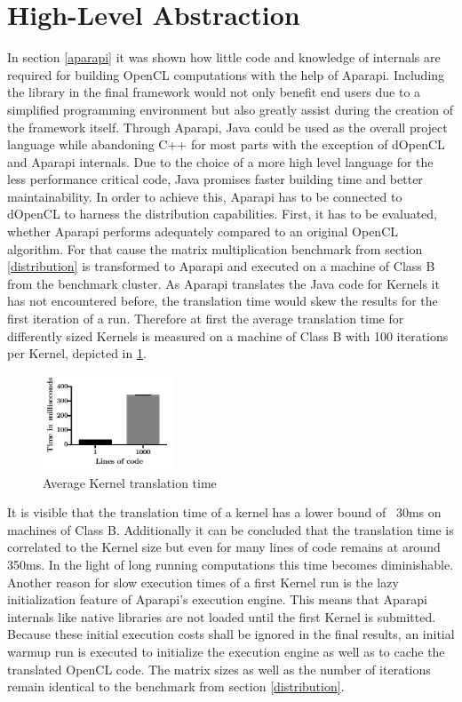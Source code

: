 \section{High-Level Abstraction}
\label{abstraction}

In section \ref{aparapi} it was shown how little code and knowledge of internals are required for building OpenCL computations with the help of Aparapi. Including the library in the final framework would not only benefit end users due to a simplified programming environment but also greatly assist during the creation of the framework itself. Through Aparapi, Java could be used as the overall project language while abandoning C++ for most parts with the exception of dOpenCL and Aparapi internals. Due to the choice of a more high level language for the less performance critical code, Java promises faster building time and better maintainability. In order to achieve this, Aparapi has to be connected to dOpenCL to harness the distribution capabilities. First, it has to be evaluated, whether Aparapi performs adequately compared to an original OpenCL algorithm. For that cause the matrix multiplication benchmark from section \ref{distribution} is transformed to Aparapi and executed on a machine of Class B from the benchmark cluster. As Aparapi translates the Java code for Kernels it has not encountered before, the translation time would skew the results for the first iteration of a run. Therefore at first the average translation time for differently sized Kernels is measured on a machine of Class B with 100 iterations per Kernel, depicted in \ref{img:aparapi_translation}.

\begin{figure}[H]
	\includegraphics[width=0.35\textwidth]{images/aparapi_translation.pdf}
	\centering
	\caption{Average Kernel translation time}
	\label{img:aparapi_translation}
\end{figure}

It is visible that the translation time of a kernel has a lower bound of ~30ms on machines of Class B. Additionally it can be concluded that the translation time is correlated to the Kernel size but even for many lines of code remains at around 350ms. In the light of long running computations this time becomes diminishable. Another reason for slow execution times of a first Kernel run is the lazy initialization feature of Aparapi's execution engine. This means that Aparapi internals like native libraries are not loaded until the first Kernel is submitted. Because these initial execution costs shall be ignored in the final results, an initial warmup run is executed to initialize the execution engine as well as to cache the translated OpenCL code. The matrix sizes as well as the number of iterations remain identical to the benchmark from section \ref{distribution}.

